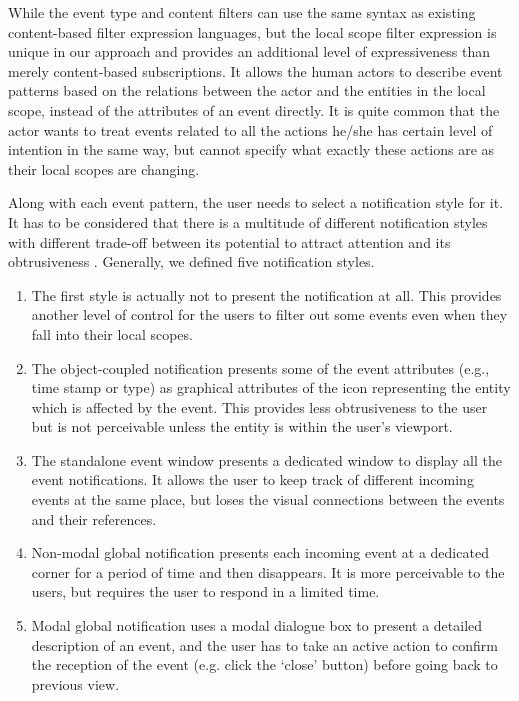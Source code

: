 While the event type and content filters can use the same syntax as existing content-based filter expression languages, but the local scope filter expression is unique in our approach and provides an additional level of expressiveness than merely content-based subscriptions. It allows the human actors to describe event patterns based on the relations between the actor and the entities in the local scope, instead of the attributes of an event directly. It is quite common that the actor wants to treat events related to all the actions he/she has certain level of intention in the same way, but cannot specify what exactly these actions are as their local scopes are changing.

Along with each event pattern, the user needs to select a notification style for it. It has to be considered that there is a multitude of different notification styles with different trade-off between its potential to attract attention and its obtrusiveness \cite{Rauschenbach1996}. Generally, we defined five notification styles. 
\begin{enumerate}
	\item The first style is actually not to present the notification at all. This provides another level of control for the users to filter out some events even when they fall into their local scopes.
	\item The object-coupled notification presents some of the event attributes (e.g., time stamp or type) as graphical attributes of the icon representing the entity which is affected by the event. This provides less obtrusiveness to the user but is not perceivable unless the entity is within the user's viewport.
	\item The standalone event window presents a dedicated window to display all the event notifications. It allows the user to keep track of different incoming events at the same place, but loses the visual connections between the events and their references.
	\item Non-modal global notification presents each incoming event at a dedicated corner for a period of time and then disappears. It is more perceivable to the users, but requires the user to respond in a limited time.
	\item Modal global notification uses a modal dialogue box to present a detailed description of an event, and the user has to take an active action to confirm the reception of the event (e.g. click the `close' button) before going back to previous view. 
\end{enumerate}

